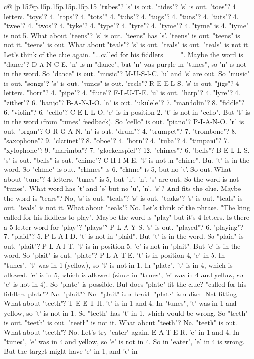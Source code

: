 \documentclass{article}
\begin{document}
{\begin{supertabular}{c@{$\;$}|p{.15\linewidth}@{}p{.15\linewidth}p{.15\linewidth}p{.15\linewidth}p{.15\linewidth}p{.15\linewidth}}
{{{"tubes"? 's' is out. "tides"? 's' is out. "toes"? 4 letters. "toys"? 4. "tops"? 4. "tots"? 4. "tubs"? 4. "tugs"? 4. "tuns"? 4. "tuts"? 4. "twee"? 4. "twos"? 4. "tyke"? 4. "type"? 4. "tyre"? 4. "tyme"? 4. "tyme" is 4. "tyme" is not 5. What about "teens"? 's' is out. "teens" has 's'. "teens" is out. "teens" is not it. "teens" is out. What about "teals"? 's' is out. "teals" is out. "teals" is not it. Let's think of the clue again. "...called for his fiddlers \_\_\_". Maybe the word is "dance"? D{-}A{-}N{-}C{-}E. 'n' is in "dance", but 'n' was purple in "tunes", so 'n' is not in the word. So "dance" is out. "music"? M{-}U{-}S{-}I{-}C. 'u' and 's' are out. So "music" is out. "songs"? 's' is out. "tunes" is out. "reels"? R{-}E{-}E{-}L{-}S. 's' is out. "jigs"? 4 letters. "horn"? 4. "pipe"? 4. "flute"? F{-}L{-}U{-}T{-}E. 'u' is out. "harp"? 4. "lyre"? 4. "zither"? 6. "banjo"? B{-}A{-}N{-}J{-}O. 'n' is out. "ukulele"? 7. "mandolin"? 8. "fiddle"? 6. "violin"? 6. "cello"? C{-}E{-}L{-}L{-}O. 'e' is in position 2. 't' is not in "cello". But 't' is in the word (from "tunes" feedback). So "cello" is out. "piano"? P{-}I{-}A{-}N{-}O. 'n' is out. "organ"? O{-}R{-}G{-}A{-}N. 'n' is out. "drum"? 4. "trumpet"? 7. "trombone"? 8. "saxophone"? 9. "clarinet"? 8. "oboe"? 4. "horn"? 4. "tuba"? 4. "timpani"? 7. "xylophone"? 9. "marimba"? 7. "glockenspiel"? 12. "chimes"? 6. "bells"? B{-}E{-}L{-}L{-}S. 's' is out. "bells" is out. "chime"? C{-}H{-}I{-}M{-}E. 't' is not in "chime". But 't' is in the word. So "chime" is out. "chimes" is 6. "chime" is 5, but no 't'. So out. What about "tune"? 4 letters. "tunes" is 5, but 'u', 'n', 's' are out. So the word is not "tunes". What word has 't' and 'e' but no 'u', 'n', 's'? And fits the clue. Maybe the word is "tears"? No, 's' is out. "teals"? 's' is out. "teaks"? 's' is out. "teals" is out. "teals" is not it. What about "teals"? No. Let's think of the phrase. "The king called for his fiddlers to play". Maybe the word is "play" but it's 4 letters. Is there a 5{-}letter word for "play"? "plays"? P{-}L{-}A{-}Y{-}S. 's' is out. "played"? 6. "playing"? 7. "plaid"? 5. P{-}L{-}A{-}I{-}D. 't' is not in "plaid". But 't' is in the word. So "plaid" is out. "plait"? P{-}L{-}A{-}I{-}T. 't' is in position 5. 'e' is not in "plait". But 'e' is in the word. So "plait" is out. "plate"? P{-}L{-}A{-}T{-}E. 't' is in position 4, 'e' in 5. In "tunes", 't' was in 1 (yellow), so 't' is not in 1. In "plate", 't' is in 4, which is allowed. 'e' is in 5, which is allowed (since in "tunes", 'e' was in 4 and yellow, so 'e' is not in 4). So "plate" is possible. But does "plate" fit the clue? "called for his fiddlers plate"? No. "plait"? No. "plait" is a braid. "plate" is a dish. Not fitting. What about "teeth"? T{-}E{-}E{-}T{-}H. 't' is in 1 and 4. In "tunes", 't' was in 1 and yellow, so 't' is not in 1. So "teeth" has 't' in 1, which would be wrong. So "teeth" is out. "teeth" is out. "teeth" is not it. What about "teeth"? No. "teeth" is out. What about "teeth"? No. Let's try "eater" again. E{-}A{-}T{-}E{-}R. 'e' in 1 and 4. In "tunes", 'e' was in 4 and yellow, so 'e' is not in 4. So in "eater", 'e' in 4 is wrong. But the target might have 'e' in 1, and 'e' in }}}
\end{supertabular}}
\end{document}
